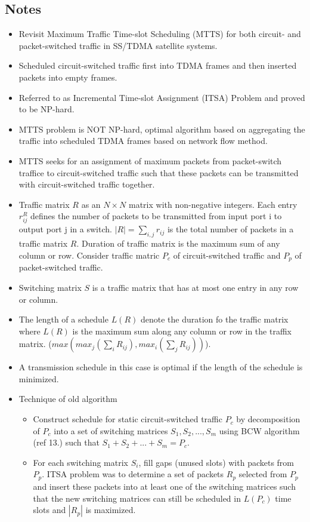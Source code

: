 \documentclass{article}
\begin{document}
\subsection{Notes}
\begin{itemize}
    \item Revisit Maximum Traffic Time-slot Scheduling (MTTS) for both circuit- and packet-switched traffic in SS/TDMA satellite systems.
    \item Scheduled circuit-switched traffic first into TDMA frames and then inserted packets into empty frames.
    \item Referred to as Incremental Time-slot Assignment (ITSA) Problem and proved to be NP-hard.
    \item MTTS problem is NOT NP-hard, optimal algorithm based on aggregating the traffic into scheduled TDMA frames based on network flow method.
    \item MTTS seeks for an assignment of maximum packets from packet-switch traffice to circuit-switched traffic such that these packets can be transmitted with circuit-switched traffic together.
    \item Traffic matrix $R$ as an $N \times N$ matrix with non-negative integers.  Each entry $r_{ij}^R$ defines the number of packets to be transmitted from input port i to output port j in a switch.  $|R|=\sum_{i,j} r_{ij}$ is the total number of packets in a traffic matrix $R$. Duration of traffic matrix is the maximum sum of any column or row. Consider traffic matric $P_c$ of circuit-switched traffic and $P_p$ of packet-switched traffic.
    \item Switching matrix $S$ is a traffic matrix that has at most one entry in any row or column.
    \item The length of a schedule $L(R)$ denote the duration fo the traffic matrix where $L(R)$ is the maximum sum along any column or row in the traffix matrix. ($max(max_j(\sum_i R_{ij}), max_i(\sum_j R_{ij}))$).
    \item A transmission schedule in this case is optimal if the length of the schedule is minimized.
    \item Technique of old algorithm
    \begin{itemize}
        \item Construct schedule for static circuit-switched traffic $P_c$ by decomposition of $P_c$ into a set of switching matrices $S_1, S_2,...,S_m$ using BCW algorithm (ref 13.) such that $S_1 + S_2 + ... + S_m = P_c$.
        \item For each switching matrix $S_i$, fill gaps (unused slots) with packets from $P_p$.  ITSA problem was to determine a set of packets $R_p$ selected from $P_p$ and insert these packets into at least one of the switching matrices such that the new switching matrices can still be scheduled in $L(P_c)$ time slots and $|R_p|$ is maximized.

\end{itemize}
\end{itemize}
\end{document}
